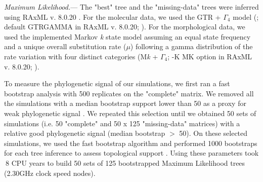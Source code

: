 \documentclass[12pt,letterpaper]{article}
\renewcommand{\subsubsection}[1]{%
\vspace{2ex}
\noindent
\textit{#1.}---}
\begin{document}
\subsubsection{Maximum Likelihood}
The "best" tree and the "missing-data" trees were inferred using RAxML v. 8.0.20 \citep{Stamatakis21012014}. For the molecular data, we used the GTR + $\Gamma_4$ model (\citealt{tavare1986}; default GTRGAMMA in RAxML v. 8.0.20; \citealt{Stamatakis21012014}).%
For the morphological data, we used the implemented Markov \textit{k} state model \citep{lewisa2001} %
 assuming an equal state frequency and a unique overall substitution rate ($\mu$) following a gamma distribution of the rate variation with four distinct categories (M\textit{k} + $\Gamma_4$; -K MK option in RAxML v. 8.0.20; \citealt{Stamatakis21012014}).

To measure the phylogenetic signal of our simulations, we first ran a fast bootstrap analysis with 500 replicates on the "complete" matrix. We removed all the simulations with a median bootstrap support lower than 50 as a proxy for weak phylogenetic signal \citep{zanderminimal2004}. We repeated this selection until we obtained 50 sets of simulations (i.e. 50 "complete" and 50 x 125 "missing-data" matrices) with a relative good phylogenetic signal (median bootstrap $>$ 50). On these selected simulations, we used the fast bootstrap algorithm and performed 1000 bootstraps for each tree inference to assess topological support \citep{pattengale2010many}.
Using these parameters took $~$8 %
CPU years to build 50 sets of 125 bootstrapped Maximum Likelihood trees (2.30GHz clock speed nodes).
\end{document}
